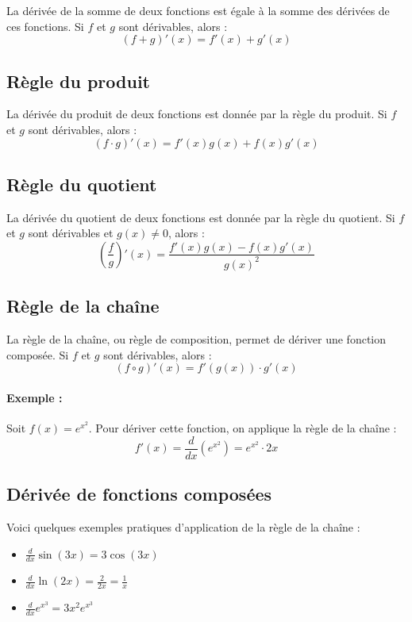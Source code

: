\documentclass{article}
\begin{document}
	La dérivée de la somme de deux fonctions est égale à la somme des dérivées de ces fonctions. Si \( f \) et \( g \) sont dérivables, alors :
	\[
	(f + g)'(x) = f'(x) + g'(x)
	\]
	
	\subsection{Règle du produit}
	
	La dérivée du produit de deux fonctions est donnée par la règle du produit. Si \( f \) et \( g \) sont dérivables, alors :
	\[
	(f \cdot g)'(x) = f'(x)g(x) + f(x)g'(x)
	\]
	
	\subsection{Règle du quotient}
	
	La dérivée du quotient de deux fonctions est donnée par la règle du quotient. Si \( f \) et \( g \) sont dérivables et \( g(x) \neq 0 \), alors :
	\[
	\left( \frac{f}{g} \right)'(x) = \frac{f'(x)g(x) - f(x)g'(x)}{g(x)^2}
	\]
	
	\subsection{Règle de la chaîne}
	
	La règle de la chaîne, ou règle de composition, permet de dériver une fonction composée. Si \( f \) et \( g \) sont dérivables, alors :
	\[
	(f \circ g)'(x) = f'(g(x)) \cdot g'(x)
	\]
	
	\paragraph{Exemple :} Soit \( f(x) = e^{x^2} \). Pour dériver cette fonction, on applique la règle de la chaîne :
	\[
	f'(x) = \frac{d}{dx} \left( e^{x^2} \right) = e^{x^2} \cdot 2x
	\]
	
	\subsection{Dérivée de fonctions composées}
	
	Voici quelques exemples pratiques d'application de la règle de la chaîne :
	
	\begin{itemize}
		\item \( \frac{d}{dx} \sin(3x) = 3 \cos(3x) \)
		\item \( \frac{d}{dx} \ln(2x) = \frac{2}{2x} = \frac{1}{x} \)
		\item \( \frac{d}{dx} e^{x^3} = 3x^2 e^{x^3} \)
	\end{itemize}
	
\end{document}
